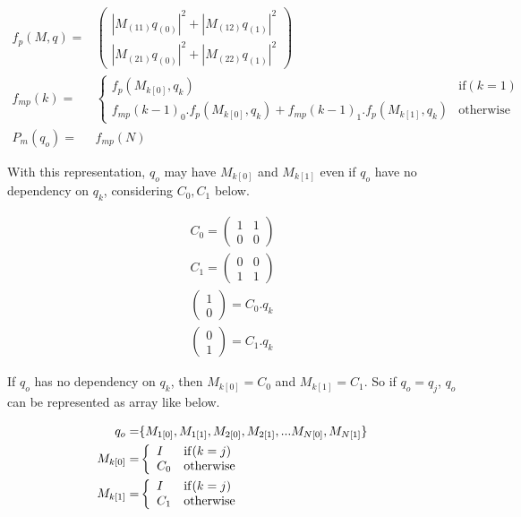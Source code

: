 \documentclass[dvipdfmx]{article}
\begin{document}
\begin{eqnarray}
f_{p}(M, q) =& \left(\begin{array}{c}
    \left| M_{(11)}q_{(0)} \right| ^{2}
    +\left| M_{(12)}q_{(1)} \right| ^{2} \\
    \left| M_{(21)}q_{(0)} \right| ^{2}
    +\left| M_{(22)}q_{(1)} \right| ^{2}
\end{array}\right) \\
f_{mp}(k) =& \left\{\begin{array}{ll}
  f_p(M_{k[0]}, q_{k}) & \mathrm{if} (k=1) \\
  f_{mp}(k-1)_{0}.f_{p}(M_{k[0]}, q_{k}) +  f_{mp}(k-1)_{1}.f_{p}(M_{k[1]}, q_{k}) & \mathrm{otherwise}
\end{array}\right. \\
P_{m}(q_{o}) =& f_{mp}(N)
\label{eq:marginalize}
\end{eqnarray}

With this representation, $q_{o}$ may have $M_{k[0]}$ and $M_{k[1]}$ even if $q_o$ have no dependency on $q_{k}$,
 considering $C_{0}, C_{1}$ below.

\begin{eqnarray}
C_{0} =  \left( \begin{array}{cc} 1 & 1 \\ 0 & 0 \end{array} \right) \\
C_{1} =  \left( \begin{array}{cc} 0 & 0 \\ 1 & 1 \end{array} \right) \\
\left( \begin{array}{c} 1 \\ 0 \end{array} \right) = C_{0}.q_{k} \\
\left( \begin{array}{c} 0 \\ 1 \end{array} \right) = C_{1}.q_{k}
\end{eqnarray}

If $q_{o}$ has no dependency on $q_{k}$, then $M_{k[0]}=C_{0}$ and $M_{k[1]}=C_{1}$.
So if $q_{o} = q_{j}$, $q_{o}$ can be represented as array like below.

\begin{eqnarray}
q_{o} =& \{M_{1[0]}, M_{1[1]}}, {M_{2[0]}, M_{2[1]}}, ... {M_{N[0]}, M_{N[1]}\} \\
M_{k[0]} =& \left\{ \begin{array}{ll}
  I & \mathrm{if} (k=j) \\
  C_{0} & \mathrm{otherwise}
\end{array} \right. \\
M_{k[1]} =& \left\{ \begin{array}{ll}
  I & \mathrm{if} (k=j) \\
  C_{1} & \mathrm{otherwise}
\end{array} \right.
\end{eqnarray}
\end{document}
